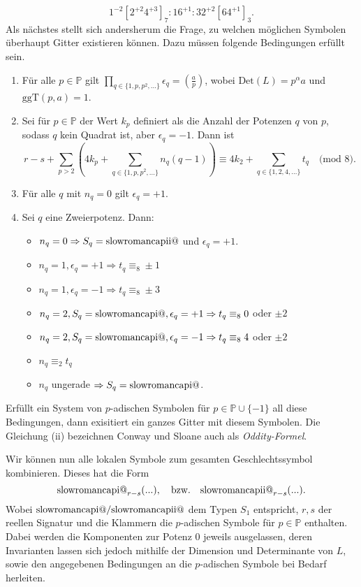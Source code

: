 \documentclass[12pt,a4paper,halfparskip,headsepline,bibtotocnumbered]{scrreprt}
\makeatletter
\theoremstyle{nummermitklammern}
\theoremstyle{nonumberbreak}
\renewcommand{\P}{\mathbb{P}}
\newcommand{\Det}{\text{Det}}
\renewcommand{\i}{\text{\expandafter\@slowromancap\romannumeral 1@}}
\newcommand{\ii}{\text{\expandafter\@slowromancap\romannumeral 2@}}
\newcommand{\ggT}{\text{ggT}}
\makeatother
\begin{document}
\begin{equation*}
	1^{-2} \left[2^{+2} 4^{+3} \right]_7 : 16^{+1} : 32^{+2} \left[ 64^{+1} \right]_3.
\end{equation*}
Als nächstes stellt sich andersherum die Frage, zu welchen möglichen Symbolen überhaupt Gitter existieren können. Dazu müssen folgende Bedingungen erfüllt sein.
\begin{enumerate}[label=(\roman*)]
	\item Für alle $p \in \P$ gilt $\prod_{q \in \lbrace 1, p, p^2, \dots \rbrace} \epsilon_q = \left( \frac{a}{p} \right)$, wobei $\Det(L) = p^\alpha a$ und $\ggT(p,a) = 1$.
	\item Sei für $p \in \P$ der Wert $k_p$ definiert als die Anzahl der Potenzen $q$ von $p$, sodass $q$ kein Quadrat ist, aber $\epsilon_q = -1$. Dann ist
		\begin{equation*}
			r - s + \sum_{p > 2} \left( 4 k_p + \sum_{q \in \lbrace 1, p, p^2, \dots \rbrace} n_q (q-1) \right) \equiv 4 k_2 + \sum_{q \in \lbrace 1, 2, 4, \dots \rbrace} t_q \quad \text{(mod } 8 \text{).}
		\end{equation*}
	\item Für alle $q$ mit $n_q = 0$ gilt $\epsilon_q = +1$.
	\item Sei $q$ eine Zweierpotenz. Dann:
		\begin{itemize}
			\item $n_q = 0 \Rightarrow S_q = \ii$ und $\epsilon_q = +1$.
			\item $n_q = 1, \epsilon_q = +1 \Rightarrow t_q \equiv_8 \pm 1$
			\item $n_q = 1, \epsilon_q = -1 \Rightarrow t_q \equiv_8 \pm 3$
			\item $n_q = 2, S_q = \i, \epsilon_q = +1 \Rightarrow t_q \equiv_8 0$ oder $\pm 2$
			\item $n_q = 2, S_q = \i, \epsilon_q = -1 \Rightarrow t_q \equiv_8 4$ oder $\pm 2$
			\item $n_q \equiv_2 t_q$
			\item $n_q$ ungerade $\Rightarrow S_q = \i$.
		\end{itemize}
\end{enumerate}

Erfüllt ein System von $p$-adischen Symbolen für $p \in \P \cup \lbrace -1 \rbrace$ all diese Bedingungen, dann exisitiert ein ganzes Gitter mit diesem Symbolen. Die Gleichung (ii) bezeichnen Conway und Sloane auch als \textit{Oddity-Formel}.\par
Wir können nun alle lokalen Symbole zum gesamten Geschlechtssymbol kombinieren. Dieses hat die Form
\begin{equation*}
	\i_{r-s}(...), \quad \text{bzw.}\quad \ii_{r-s}(...).
\end{equation*}
Wobei $\i/\ii$ dem Typen $S_1$ entspricht, $r,s$ der reellen Signatur und die Klammern die $p$-adischen Symbole für $p \in \P$ enthalten. Dabei werden die Komponenten zur Potenz $0$ jeweils ausgelassen, deren Invarianten lassen sich jedoch mithilfe der Dimension und Determinante von $L$, sowie den angegebenen Bedingungen an die $p$-adischen Symbole bei Bedarf herleiten.
\end{document}
